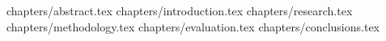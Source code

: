 \documentclass[a4paper,12pt]{article}
\begin{document}

\tableofcontents
\clearpage

{chapters/abstract.tex}
{chapters/introduction.tex}
{chapters/research.tex}
{chapters/methodology.tex}
{chapters/evaluation.tex}
{chapters/conclusions.tex}
\end{document}
